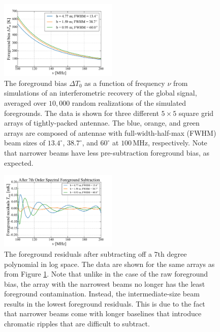 \documentclass[twocolumn,apj,numberedappendix]{emulateapj}
\begin{document}
\begin{figure}[h]
	\centering
	\includegraphics[width=0.50\textwidth]{figures/unsub_T0_beamSize.pdf}
	\caption{The foreground bias $\Delta T_0$ as a function of frequency $\nu$ from simulations of an interferometric recovery of the global signal, averaged over $10,000$ random realizations of the simulated foregrounds. The data is shown for three different $5\times5$ square grid arrays of tightly-packed antennae. The blue, orange, and green arrays are composed of antennae with full-width-half-max (FWHM) beam sizes of $13.4^\circ$, $38.7^\circ$, and $60^\circ$ at $100\,\textrm{MHz}$, respectively. Note that narrower beams have less pre-subtraction foreground bias, as expected.}
	\label{fig:unsub_T0_beamSize}
\end{figure}

\begin{figure}[h]
	\centering
	\includegraphics[width=0.50\textwidth]{figures/subPoly7_T0_beamSize.pdf}
	\caption{The foreground residuals after subtracting off a $7$th degree polynomial in log space. The data are shown for the same arrays as from Figure \ref{fig:unsub_T0_beamSize}. Note that unlike in the case of the raw foreground bias, the array with the narrowest beams no longer has the least foreground contamination. Instead, the intermediate-size beam results in the lowest foreground residuals. This is due to the fact that narrower beams come with longer baselines that introduce chromatic ripples that are difficult to subtract.}
	\label{fig:subPoly7_T0_beamSize}
\end{figure}
\end{document}
